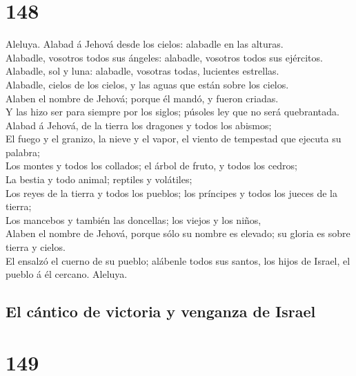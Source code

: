 \hypertarget{section-147}{%
\section{148}\label{section-147}}

 Aleluya. Alabad á Jehová desde los cielos: alabadle en las
alturas.\\
 Alabadle, vosotros todos sus ángeles: alabadle, vosotros
todos sus ejércitos.\\
 Alabadle, sol y luna: alabadle, vosotras todas, lucientes
estrellas.\\
 Alabadle, cielos de los cielos, y las aguas que están sobre
los cielos.\\
 Alaben el nombre de Jehová; porque él mandó, y fueron
criadas.\\
 Y las hizo ser para siempre por los siglos; púsoles ley que
no será quebrantada.\\
 Alabad á Jehová, de la tierra los dragones y todos los
abismos;\\
 El fuego y el granizo, la nieve y el vapor, el viento de
tempestad que ejecuta su palabra;\\
 Los montes y todos los collados; el árbol de fruto, y todos
los cedros;\\
 La bestia y todo animal; reptiles y volátiles;\\
 Los reyes de la tierra y todos los pueblos; los príncipes
y todos los jueces de la tierra;\\
 Los mancebos y también las doncellas; los viejos y los
niños,\\
 Alaben el nombre de Jehová, porque sólo su nombre es
elevado; su gloria es sobre tierra y cielos.\\
 El ensalzó el cuerno de su pueblo; alábenle todos sus
santos, los hijos de Israel, el pueblo á él cercano. Aleluya.

\hypertarget{el-cuxe1ntico-de-victoria-y-venganza-de-israel}{%
\subsection{El cántico de victoria y venganza de
Israel}\label{el-cuxe1ntico-de-victoria-y-venganza-de-israel}}

\hypertarget{section-148}{%
\section{149}\label{section-148}}

